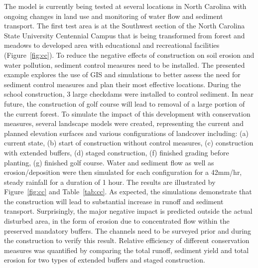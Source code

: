 \documentclass[fleqn,12pt,twoside]{article}
\begin{document}
The model is currently being tested at several locations in North Carolina
with ongoing changes in land use and monitoring of water flow and sediment
transport.
The first test area is at the Southwest section of
the North Carolina State University Centennial Campus 
that is being transformed from forest and meadows to
developed area with educational and recreational facilities (Figure~\ref{fig:cc}).
To reduce the negative effects of construction on soil
erosion and water pollution, sediment control measures need
to be installed. The presented example explores the use of GIS
and simulations to better assess the need for sediment control
measures and plan their most effective locations.
During the school construction, 3 large checkdams 
were installed to control sediment. In near future, the construction of 
golf course will lead to removal of a large portion of the current forest.
To simulate the impact of this development with 
conservation measures, several landscape models were created, representing
the current and planned elevation surfaces and various configurations of landcover
including: (a) current state, (b) start of construction without control measures, 
(c) construction with extended buffers, (d) staged construction, 
(f) finished grading before planting, (g) finished golf course. 
Water and sediment flow as well as 
erosion/deposition were then simulated for each configuration 
for a 42mm/hr, steady rainfall for a duration of 1 hour.
The results are illustrated by Figure~\ref{fig:cc} and Table~\ref{tab:cc}.
As expected, the simulations demonstrate that the construction will 
lead to substantial increase in runoff and sediment transport. Surprisingly,
the major negative impact is predicted outside the actual
disturbed area, in the form of erosion due to concentrated flow within the preserved
mandatory buffers. The channels need to be surveyed prior and during the construction
to verify this result. Relative efficiency of different conservation measures
was quantified by comparing the total runoff, sediment yield and total 
erosion for two types of extended buffers and
staged construction.
\end{document}
